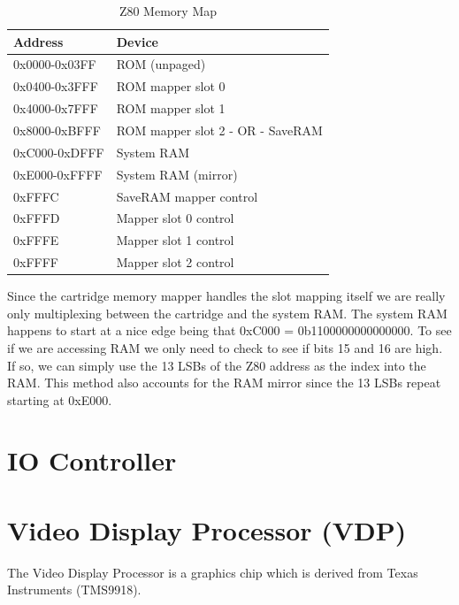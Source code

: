 \documentclass{article}
\begin{document}
\begin{table}[H]
    \centering
    \selectfont
    \begin{tabular}{l|l}
        Address     & Device                           \\
        \hline
        \hline
        0x0000-0x03FF & ROM (unpaged)                    \\ 
        0x0400-0x3FFF & ROM mapper slot 0                \\ 
        0x4000-0x7FFF & ROM mapper slot 1                \\ 
        0x8000-0xBFFF & ROM mapper slot 2 - OR - SaveRAM \\ 
        0xC000-0xDFFF & System RAM                       \\ 
        0xE000-0xFFFF & System RAM (mirror)              \\ 
        0xFFFC       & SaveRAM mapper control           \\ 
        0xFFFD       & Mapper slot 0 control            \\ 
        0xFFFE       & Mapper slot 1 control            \\ 
        0xFFFF       & Mapper slot 2 control            \\
    \end{tabular}
    \fontfamily{}\selectfont
    \caption{Z80 Memory Map \protect\cite{mem_map_table}}
\end{table}

Since the cartridge memory mapper handles the slot mapping itself we are
really only multiplexing between the cartridge and the system RAM.
The system RAM happens to start at a nice edge being that
0xC000 = 0b1100000000000000. To see if we are accessing RAM
we only need to check to see if bits 15 and 16 are high. If so,
we can simply use the 13 LSBs of the Z80 address as the index into the RAM. 
This method also accounts for the RAM mirror since the 13 LSBs repeat
starting at 0xE000.

\section{IO Controller}
\section{Video Display Processor (VDP)}

The Video Display Processor is a graphics chip which is derived from 
Texas Instruments (TMS9918). 
\end{document}
